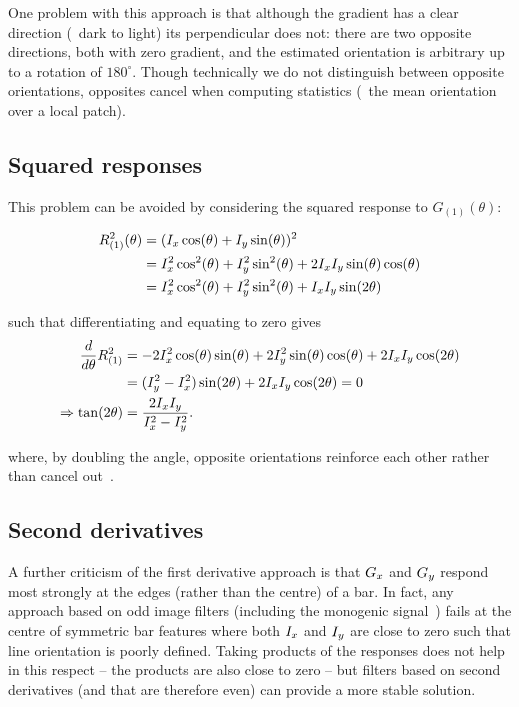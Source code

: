 One problem with this approach is that although the gradient has a clear direction (\eg~dark to light) its perpendicular does not: there are two opposite directions, both with zero gradient, and the estimated orientation is arbitrary up to a rotation of $180^\circ$. Though technically we do not distinguish between opposite orientations, opposites cancel when computing statistics (\eg~the mean orientation over a local patch). 


\subsection{Squared responses}
This problem can be avoided by considering the squared response to $G_{(1)}(\theta)$:

\begin{align}
R_{(1)}^2(\theta)
	&=	(I_x \cos(\theta) + I_y \sin(\theta))^2 \\
	&= 	I_x^2 \cos^2(\theta)+I_y^2 \sin^2(\theta)+2I_xI_y\sin(\theta)\cos(\theta) \\
	&= 	I_x^2 \cos^2(\theta)+I_y^2 \sin^2(\theta)+I_xI_y\sin(2\theta)
\label{e:R1sqr}
\end{align}

\noindent such that differentiating and equating to zero gives
%
\begin{align}
\frac{d}{d\theta}R_{(1)}^2
	&= 	-2I_x^2 \cos(\theta)\sin(\theta) + 2I_y^2 \sin(\theta)\cos(\theta) + 2I_xI_y\cos(2\theta) \\
	&= 	(I_y^2-I_x^2) \sin(2\theta) + 2I_xI_y\cos(2\theta) = 0 \\
\Rightarrow \tan(2\theta)
	&= 	\frac{2I_xI_y}{I_x^2-I_y^2}.
\label{e:t1sqr}
\end{align}

\noindent where, by doubling the angle, opposite orientations reinforce each other rather than cancel out~\cite{Mardia_Jupp_00}. 


%


\subsection{Second derivatives}
A further criticism of the first derivative approach is that $G_x$ and $G_y$ respond most strongly at the edges (rather than the centre) of a bar. In fact, any approach based on odd image filters (including the monogenic signal~\cite{Felsberg_Sommer_TSP01}) fails at the centre of symmetric bar features where both $I_x$ and $I_y$ are close to zero such that line orientation is poorly defined. Taking products of the responses does not help in this respect -- the products are also close to zero -- but filters based on second derivatives (and that are therefore even) can provide a more stable solution.

